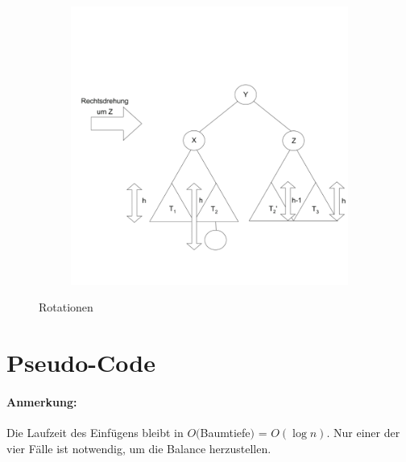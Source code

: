 \begin{figure}
\begin{subfigure}[H]{0.3\textwidth}
	\end{subfigure}
	\begin{subfigure}[H]{0.4\textwidth}
				\includegraphics[width=\linewidth]{11/Grafik/img7_doppelRotation_4.png}
	\end{subfigure}
	\caption{Rotationen}
\end{figure}

\newpage


\section{Pseudo-Code}


\paragraph{Anmerkung:} Die Laufzeit des Einfügens bleibt in $O($Baumtiefe$)$ = $O(\log{n})$. Nur einer der vier Fälle ist notwendig, um die Balance herzustellen. 
\pagebreak